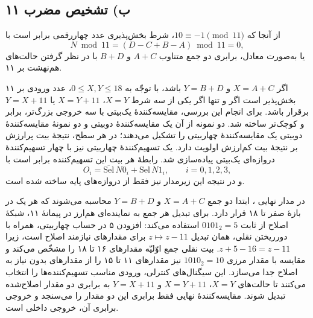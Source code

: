 \documentclass[12pt,a4paper]{article}
\begin{document}

	\subsection*{ب) تشخیص مضرب ۱۱}
	از آنجا که \(10\equiv-1\pmod {11}\)، شرط بخش‌پذیری عدد چهاررقمی برابر است با
	\[
		N\bmod11=(D-C+B-A)\bmod11=0,
	\]
	یا به‌صورت معادل، برابری دو جمع متناوب \(A+C\) و \(B+D\) با در نظر گرفتن حالت‌های هم‌نهشت بر ۱۱.

	اگر \(X=A+C\) و \(Y=B+D\) باشد، با توجّه به \(0\leq X,Y\leq18\)، عدد ورودی بر ۱۱ بخش‌پذیر است اگر و تنها اگر یکی از سه شرط \(X=Y\)، \(X=Y+11\) یا \(Y=X+11\) برقرار باشد. برای انجام این بررسی، مقایسه‌کنندهٔ یک‌بیتی با سه خروجی بزرگ‌تر، برابر و کوچک‌تر ساخته شد. دو نمونه از آن یک مقایسه‌کنندهٔ دوبیتی و دو نمونهٔ مقایسه‌کنندهٔ دوبیتی یک مقایسه‌کنندهٔ چهاربیتی را تشکیل می‌دهند؛ در هر سطح، نتیجهٔ بیت پرارزش بر نتیجهٔ بیت کم‌ارزش اولویت دارد. یک تسهیم‌کنندهٔ چهاربیتی نیز با چهار تسهیم‌کنندهٔ دروازه‌ای یک‌بیتی پیاده‌سازی شد. رابطهٔ هر بیت این تسهیم‌کننده برابر است با
	\[
		O_i=\overline{\mathrm{Sel}}\,N0_i+\mathrm{Sel}\,N1_i,
		\qquad i=0,1,2,3,
	\]
	و در نتیجه این زیرمدار نیز فقط از دروازه‌های پایه ساخته شده است.


	در مدار نهایی ، ابتدا دو جمع \(X=A+C\) و \(Y=B+D\) محاسبه می‌شوند که هر یک در بازهٔ صفر تا ۱۸ قرار دارد. برای تبدیل هر جمع به نماینده‌ای هم‌ارز در پیمانهٔ ۱۱، شبکهٔ اصلاح از ثابت
	\(0101_2=5\) استفاده می‌کند: افزودن ۵ در حساب چهاربیتی، همراه با دورریختن نقلی، همان تبدیل \(z\mapsto z-11\) برای مقدارهای نیازمند اصلاح است، زیرا \(z+5-16=z-11\). بیت نقلی جمع اوّلیّه مقدارهای ۱۶ تا ۱۸ را مشخّص می‌کند و مقایسه با مقدار مرزی \(1010_2=10\) نیز مقدارهای ۱۱ تا ۱۵ را از مقدارهای بدون نیاز به اصلاح جدا می‌سازد. این سیگنال‌های کنترلی، ورودی مناسب تسهیم‌کننده‌ها را انتخاب می‌کنند تا حالت‌های \(X=Y\)، \(X=Y+11\) و \(Y=X+11\) به برابری دو مقدار اصلاح‌شده تبدیل شوند. مقایسه‌کنندهٔ نهایی فقط برابری این دو مقدار را می‌سنجد و خروجی برابری آن، خروجی داخلی  است.
\end{document}
